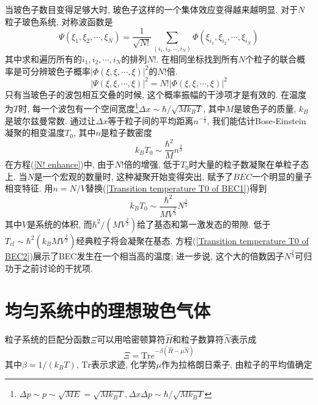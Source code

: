 \documentclass{book}
\begin{document}
当玻色子数目变得足够大时, 玻色子这样的一个集体效应变得越来越明显. 对于$N$粒子玻色系统, 对称波函数是
\begin{equation}\label{The symmetrized wave function}
  \Psi(\xi_1,\xi_2,\cdots,\xi_N)=\frac{1}{\sqrt{N!}}\sum_{(i_1,i_2,\cdots,i_N)}\Phi(\xi_{i_1},\xi_{i_2},\cdots,\xi_{i_N})
\end{equation}
其中求和遍历所有的$i_1,i_2,\cdots,i_N$的排列$N!$. 在相同坐标找到所有$N$个粒子的联合概率是可分辨玻色子概率$|\Phi(\xi,\xi,\cdots,\xi)|^2$的$N!$倍.
\begin{equation}\label{N! enhance}
  |\Psi(\xi,\xi,\cdots,\xi)|^2=N!|\Phi(\xi,\xi,\cdots,\xi)|^2
\end{equation}
只有当玻色子的波包相互交叠的时候, 这个概率振幅的干涉项才是有效的. 在温度为$T$时, 每一个波包有一个空间宽度\footnote{$\Delta p\sim
p\sim\sqrt{ME}=\sqrt{Mk_BT},\Delta x\Delta p\sim\hbar/\sqrt{Mk_BT}$}$\Delta x\sim\hbar/\sqrt{Mk_BT}$, 其中$M$是玻色子的质量, $k_B$是玻尔兹曼常数. 通过让$\Delta x$等于粒子间的平均距离$n^{-\frac{1}{3}}$, 我们能估计Bose-Einstein凝聚的相变温度$T_0$, 其中$n$是粒子数密度
\begin{equation}\label{Transition temperature T0 of BEC1}
  k_BT_0\sim\frac{\hbar^2}{M}n^{\frac{2}{3}}
\end{equation}
在方程(\eqref{N! enhance})中, 由于$N!$倍的增强, 低于$T_0$时大量的粒子数凝聚在单粒子态上. 当$N$是一个宏观的数量时, 这种凝聚开始变得突出, 赋予了$BEC$一个明显的量子相变特征. 用$n=N/V$替换(\eqref{Transition temperature T0 of BEC1})得到
\begin{equation}\label{Transition temperature T0 of BEC2}
  k_BT_0\sim\frac{\hbar^2}{MV^{\frac{2}{3}}}N^{\frac{2}{3}}
\end{equation}
其中$V$是系统的体积, 而$\hbar^2/(MV^{\frac{2}{3}})$给了基态和第一激发态的带隙. 低于$T_{cl}\sim\hbar^2(k_BMV^{\frac{2}{3}})$经典粒子将会凝聚在基态. 方程(\eqref{Transition temperature T0 of BEC2})展示了BEC发生在一个相当高的温度; 进一步说, 这个大的倍数因子$N^{\frac{2}{3}}$可归功于之前讨论的干扰项.
\section{均匀系统中的理想玻色气体}
粒子系统的巨配分函数$\Xi$可以用哈密顿算符$\hat{H}$和粒子数算符$\hat{N}$表示成
\begin{equation}\label{The Grand Partition function}
  \Xi=\mathrm{Tr}e^{-\beta(\hat{H}-\mu\hat{N})}
\end{equation}
其中$\beta=1/(k_BT)$, $\mathrm{Tr}$表示求迹, 化学势$\mu$作为拉格朗日乘子, 由粒子的平均值确定
\end{document}
